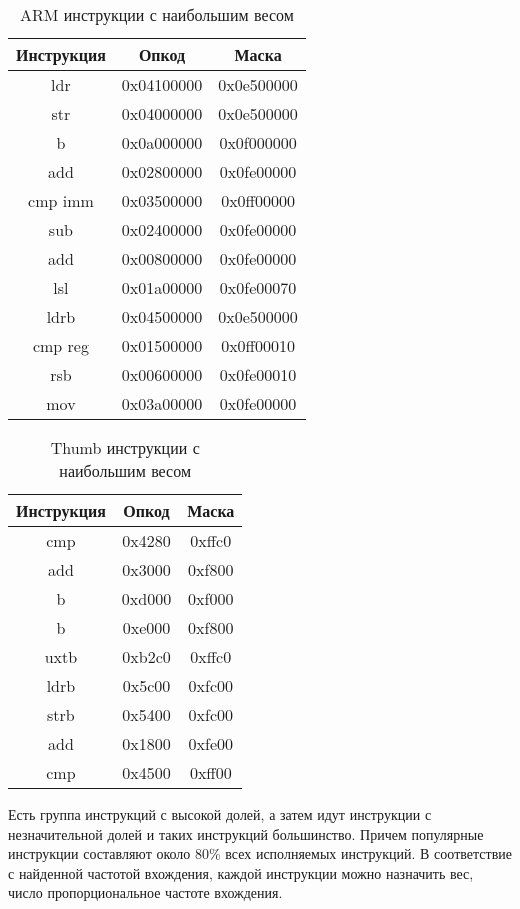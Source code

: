 \begin{table}[h!] \label{tab:arm_top}
	\caption{\label{tab:stat_arm_top} ARM инструкции с наибольшим весом}
	\begin{center}
		\begin{tabular} {|c|c|c|}
			\hline
			Инструкция & Опкод & Маска \\
			\hline
			ldr & 0x04100000 & 0x0e500000 \\
			\hline
			str & 0x04000000 & 0x0e500000 \\
			\hline
			b   & 0x0a000000 & 0x0f000000 \\
			\hline
			add & 0x02800000 & 0x0fe00000 \\
			\hline
			cmp imm & 0x03500000 & 0x0ff00000 \\
			\hline
			sub & 0x02400000 & 0x0fe00000 \\
			\hline
			add & 0x00800000 & 0x0fe00000 \\
			\hline
			lsl & 0x01a00000 & 0x0fe00070 \\
			\hline
			ldrb & 0x04500000 & 0x0e500000 \\
			\hline
			cmp reg & 0x01500000 & 0x0ff00010 \\
			\hline
			rsb & 0x00600000 & 0x0fe00010 \\
			\hline
			mov & 0x03a00000 & 0x0fe00000\\
			\hline
		\end{tabular}
	\end{center}
\end{table}

\begin{table}[h!]
	\caption{\label{tab:stat_thumb_top} Thumb инструкции с наибольшим весом}
	\begin{center}
		\begin{tabular} {|c|c|c|}
			\hline
			Инструкция & Опкод & Маска \\
			\hline
			cmp & 0x4280 & 0xffc0 \\
			\hline
			add & 0x3000 & 0xf800 \\
			\hline
			b   & 0xd000 & 0xf000 \\
			\hline
			b & 0xe000 & 0xf800 \\
			\hline
			uxtb & 0xb2c0 & 0xffc0 \\
			\hline
			ldrb & 0x5c00 & 0xfc00 \\
			\hline
			strb & 0x5400 & 0xfc00 \\
			\hline
			add & 0x1800 & 0xfe00 \\
			\hline
			cmp & 0x4500 & 0xff00 \\
			\hline
		\end{tabular}
	\end{center}
\end{table}

Есть группа инструкций с высокой долей, а затем идут инструкции с незначительной долей и таких инструкций большинство. Причем популярные инструкции составляют около 80\% всех исполняемых инструкций. В соответствие с найденной частотой вхождения, каждой инструкции можно назначить вес, число пропорциональное частоте вхождения.


